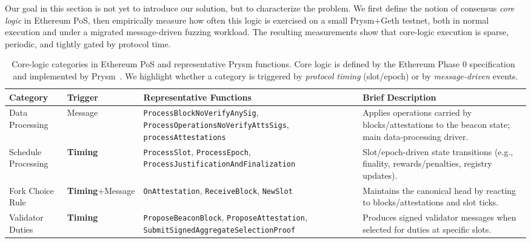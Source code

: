 Our goal in this section is not yet to introduce our solution, but to characterize the problem. We first define the notion of consensus \emph{core logic} in Ethereum PoS, then empirically measure how often this logic is exercised on a small Prysm+Geth testnet, both in normal execution and under a migrated message-driven fuzzing workload. The resulting measurements show that core-logic execution is sparse, periodic, and tightly gated by protocol time.

\begin{table}[htbp]
\centering
\caption{Core-logic categories in Ethereum PoS and representative Prysm functions. Core logic is defined by the Ethereum Phase 0 specification~\cite{ethereum_phase0_2020} and implemented by Prysm~\cite{prysm}. We highlight whether a category is triggered by \emph{protocol timing} (slot/epoch) or by \emph{message-driven} events.}
\label{tab:core_logic_categories}
\begin{tabular}{p{}p{}p{}p{}}
\toprule
\textbf{Category} & \textbf{Trigger} & \textbf{Representative Functions} & \textbf{Brief Description} \\
\midrule
\rowcolor{lightgray!20}
Data Processing & Message & \texttt{ProcessBlockNoVerifyAnySig}, \texttt{ProcessOperationsNoVerifyAttsSigs}, \texttt{processAttestations} & Applies operations carried by blocks/attestations to the beacon state; main data-processing driver. \\

\rowcolor{lightgray!5}
Schedule Processing & \textbf{Timing} & \texttt{ProcessSlot}, \texttt{ProcessEpoch}, \texttt{ProcessJustificationAndFinalization} & Slot/epoch-driven state transitions (e.g., finality, rewards/penalties, registry updates). \\

\rowcolor{lightgray!20}
Fork Choice Rule & \textbf{Timing}+Message & \texttt{OnAttestation}, \texttt{ReceiveBlock}, \texttt{NewSlot} & Maintains the canonical head by reacting to blocks/attestations and slot ticks. \\

\rowcolor{lightgray!5}
Validator Duties & \textbf{Timing} & \texttt{ProposeBeaconBlock}, \texttt{ProposeAttestation}, \texttt{SubmitSignedAggregateSelectionProof} & Produces signed validator messages when selected for duties at specific slots. \\
\bottomrule
\end{tabular}
\end{table}

